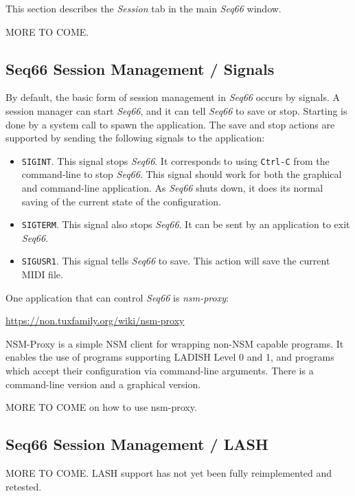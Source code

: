    This section describes the \textsl{Session} tab in the main
   \textsl{Seq66} window.

   MORE TO COME.

\subsection{Seq66 Session Management / Signals}
\label{subsec:sessions_signals}

   By default, the basic form of session management in
   \textsl{Seq66} occurs by signals.  A
   session manager can start \textsl{Seq66}, and it can tell \textsl{Seq66} to
   save or stop.  Starting is done by a system call to spawn the application.
   The save and stop actions are supported by sending the following signals to
   the application:

   \begin{itemize}
      \item \texttt{SIGINT}.  This signal stops \textsl{Seq66}. It corresponds
         to using \texttt{Ctrl-C} from the command-line to stop \textsl{Seq66}.
         This signal should work for both the graphical and command-line
         application.  As \textsl{Seq66} shuts down, it does its normal saving
         of the current state of the configuration.
      \item \texttt{SIGTERM}.  This signal also stops \textsl{Seq66}.  It can
         be sent by an application to exit \textsl{Seq66}.
      \item \texttt{SIGUSR1}.  This signal tells \textsl{Seq66} to save.  This
         action will save the current MIDI file.
   \end{itemize}

   One application that can control \textsl{Seq66} is \textsl{nsm-proxy}:

      \url{https://non.tuxfamily.org/wiki/nsm-proxy}

   NSM-Proxy is a simple NSM client for wrapping non-NSM capable programs. It
   enables the use of programs supporting LADISH Level 0 and 1, and programs
   which accept their configuration via command-line arguments.  There is a
   command-line version and a graphical version.

   MORE TO COME on how to use nsm-proxy.

\subsection{Seq66 Session Management / LASH}
\label{subsec:sessions_lash}

   MORE TO COME.  LASH support has not yet been fully reimplemented and retested.




